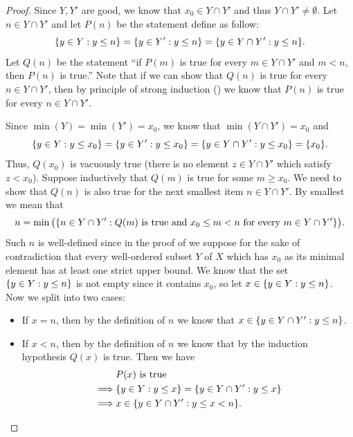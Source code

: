 \begin{proof}
  Since \(Y, Y'\) are good, we know that \(x_0 \in Y \cap Y'\) and thus \(Y \cap Y' \neq \emptyset\).
  Let \(n \in Y \cap Y'\) and let \(P(n)\) be the statement define as follow:
  \[
    \set{y \in Y : y \leq n} = \set{y \in Y' : y \leq n} = \set{y \in Y \cap Y' : y \leq n}.
  \]
  Let \(Q(n)\) be the statement ``if \(P(m)\) is true for every \(m \in Y \cap Y'\) and \(m < n\), then \(P(n)\) is true.''
  Note that if we can show that \(Q(n)\) is true for every \(n \in Y \cap Y'\), then by principle of strong induction () we know that \(P(n)\) is true for every \(n \in Y \cap Y'\).

  Since \(\min(Y) = \min(Y') = x_0\), we know that \(\min(Y \cap Y') = x_0\) and
  \[
    \set{y \in Y : y \leq x_0} = \set{y \in Y' : y \leq x_0} = \set{y \in Y \cap Y' : y \leq x_0} = \set{x_0}.
  \]
  Thus, \(Q(x_0)\) is vacuously true (there is no element \(z \in Y \cap Y'\) which satisfy \(z < x_0\)).
  Suppose inductively that \(Q(m)\) is true for some \(m \geq x_0\).
  We need to show that \(Q(n)\) is also true for the next smallest item \(n \in Y \cap Y'\).
  By smallest we mean that
  \[
    n = \min\big(\set{n \in Y \cap Y' : Q(m) \text{ is true and } x_0 \leq m < n \text { for every } m \in Y \cap Y'}\big).
  \]
  Such \(n\) is well-defined since in the proof of  we suppose for the sake of contradiction that every well-ordered subset \(Y\) of \(X\) which has \(x_0\) as its minimal element has at least one strict upper bound.
  We know that the set \(\left\lbrace y \in Y : y \leq n\right\rbrace\) is not empty since it contains \(x_0\), so let \(x \in \left\lbrace y \in Y : y \leq n\right\rbrace\).
  Now we split into two cases:
  \begin{itemize}
    \item If \(x = n\), then by the definition of \(n\) we know that \(x \in \left\lbrace y \in Y \cap Y' : y \leq n\right\rbrace\).
    \item If \(x < n\), then by the definition of \(n\) we know that by the induction hypothesis \(Q(x)\) is true.
          Then we have
          \begin{align*}
                     & P(x) \text{ is true}                                        \\
            \implies & \set{y \in Y : y \leq x} = \set{y \in Y \cap Y' : y \leq x} \\
            \implies & x \in \set{y \in Y \cap Y' : y \leq x < n}.
          \end{align*}
  \end{itemize}

\end{proof}
